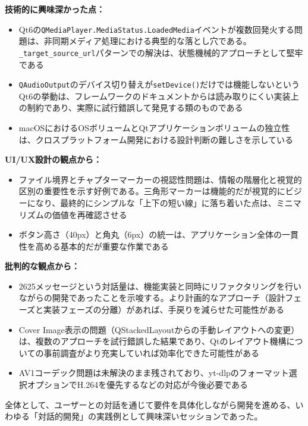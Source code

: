 \documentclass[10pt,a4paper,twocolumn]{article}
\begin{document}
\textbf{技術的に興味深かった点：}
\begin{itemize}
    \item Qt6の\texttt{QMediaPlayer.MediaStatus.LoadedMedia}イベントが複数回発火する問題は、非同期メディア処理における典型的な落とし穴である。\texttt{\_target\_source\_url}パターンでの解決は、状態機械的アプローチとして堅牢である
    \item \texttt{QAudioOutput}のデバイス切り替えが\texttt{setDevice()}だけでは機能しないというQt6の挙動は、フレームワークのドキュメントからは読み取りにくい実装上の制約であり、実際に試行錯誤して発見する類のものである
    \item macOSにおけるOSボリュームとQtアプリケーションボリュームの独立性は、クロスプラットフォーム開発における設計判断の難しさを示している
\end{itemize}

\textbf{UI/UX設計の観点から：}
\begin{itemize}
    \item ファイル境界とチャプターマーカーの視認性問題は、情報の階層化と視覚的区別の重要性を示す好例である。三角形マーカーは機能的だが視覚的にビジーになり、最終的にシンプルな「上下の短い線」に落ち着いた点は、ミニマリズムの価値を再確認させる
    \item ボタン高さ（40px）と角丸（6px）の統一は、アプリケーション全体の一貫性を高める基本的だが重要な作業である
\end{itemize}

\textbf{批判的な観点から：}
\begin{itemize}
    \item 2625メッセージという対話量は、機能実装と同時にリファクタリングを行いながらの開発であったことを示唆する。より計画的なアプローチ（設計フェーズと実装フェーズの分離）があれば、手戻りを減らせた可能性がある
    \item Cover Image表示の問題（QStackedLayoutからの手動レイアウトへの変更）は、複数のアプローチを試行錯誤した結果であり、Qtのレイアウト機構についての事前調査がより充実していれば効率化できた可能性がある
    \item AV1コーデック問題は未解決のまま残されており、yt-dlpのフォーマット選択オプションでH.264を優先するなどの対応が今後必要である
\end{itemize}

全体として、ユーザーとの対話を通じて要件を具体化しながら開発を進める、いわゆる「対話的開発」の実践例として興味深いセッションであった。
\end{document}
